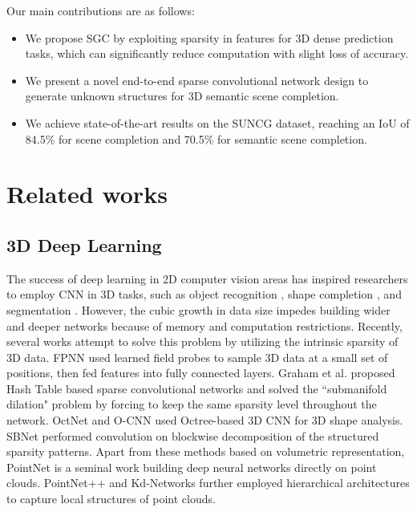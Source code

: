 \documentclass[runningheads]{llncs}
\begin{document}
Our main contributions are as follows:
\begin{itemize}
  \item We propose SGC by exploiting sparsity in features for 3D dense prediction tasks, which can significantly reduce computation with slight loss of accuracy.
  \item We present a novel end-to-end sparse convolutional network design to generate unknown structures for 3D semantic scene completion.
  \item We achieve state-of-the-art results on the SUNCG dataset, reaching an IoU of 84.5\% for scene completion and 70.5\% for semantic scene completion.
\end{itemize}

\section{Related works}

\subsection{3D Deep Learning}
\label{sec:3DDL}
The success of deep learning in 2D computer vision areas has inspired researchers to  employ CNN in 3D tasks, such as object recognition \cite{Wu2015,Maturana2015,Qi}, shape completion \cite{Wu2015,song2016semantic,Dai2016}, and segmentation \cite{song2016semantic,Ben-Shabat2017}. However, the cubic growth in data size impedes building wider and deeper networks because of memory and computation restrictions. Recently, several works attempt to solve this problem by utilizing the intrinsic sparsity of 3D data. FPNN \cite{Li2016a} used learned field probes to sample 3D data at a small set of positions, then fed features into fully connected layers. Graham et al. \cite{Graham2015,2017arXiv170601307G} proposed Hash Table based sparse convolutional networks and solved the ``submanifold dilation" problem by forcing to keep the same sparsity level throughout the network.
OctNet \cite{Riegler2016} and O-CNN \cite{wang2017cnn} used Octree-based 3D CNN for 3D shape analysis. SBNet \cite{ren2018sbnet} performed convolution on blockwise decomposition of the structured sparsity patterns. Apart from these methods based on volumetric representation, PointNet \cite{qi2017pointnet} is a seminal work building deep neural networks directly on point clouds. PointNet++ \cite{qi2017pointnet++} and Kd-Networks \cite{klokov2017escape} further employed hierarchical architectures to capture local structures of point clouds.
\end{document}
